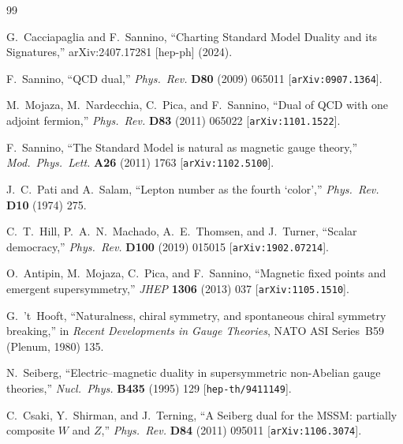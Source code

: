 \documentclass[11pt,a4paper]{article}
\begin{document}
\begin{thebibliography}{99}

  G.~Cacciapaglia and F.~Sannino,
  ``Charting Standard Model Duality and its Signatures,''
  arXiv:2407.17281 [hep-ph] (2024).

  F.~Sannino,
  ``QCD dual,''
  \textit{Phys.~Rev.} \textbf{D80} (2009) 065011
  [\texttt{arXiv:0907.1364}].

  M.~Mojaza, M.~Nardecchia, C.~Pica, and F.~Sannino,
  ``Dual of QCD with one adjoint fermion,''
  \textit{Phys.~Rev.} \textbf{D83} (2011) 065022
  [\texttt{arXiv:1101.1522}].

  F.~Sannino,
  ``The Standard Model is natural as magnetic gauge theory,''
  \textit{Mod.~Phys.~Lett.} \textbf{A26} (2011) 1763
  [\texttt{arXiv:1102.5100}].

  J.~C.~Pati and A.~Salam,
  ``Lepton number as the fourth `color',''
  \textit{Phys.~Rev.} \textbf{D10} (1974) 275.

  C.~T.~Hill, P.~A.~N.~Machado, A.~E.~Thomsen, and J.~Turner,
  ``Scalar democracy,''
  \textit{Phys.~Rev.} \textbf{D100} (2019) 015015
  [\texttt{arXiv:1902.07214}].

  O.~Antipin, M.~Mojaza, C.~Pica, and F.~Sannino,
  ``Magnetic fixed points and emergent supersymmetry,''
  \textit{JHEP} \textbf{1306} (2013) 037
  [\texttt{arXiv:1105.1510}].

  G.~'t~Hooft,
  ``Naturalness, chiral symmetry, and spontaneous chiral symmetry
  breaking,'' in \textit{Recent Developments in Gauge Theories},
  NATO ASI Series~B59 (Plenum, 1980) 135.

  N.~Seiberg,
  ``Electric--magnetic duality in supersymmetric non-Abelian gauge
  theories,''
  \textit{Nucl.~Phys.} \textbf{B435} (1995) 129
  [\texttt{hep-th/9411149}].

  C.~Csaki, Y.~Shirman, and J.~Terning,
  ``A Seiberg dual for the MSSM: partially composite $W$ and $Z$,''
  \textit{Phys.~Rev.} \textbf{D84} (2011) 095011
  [\texttt{arXiv:1106.3074}].

\end{thebibliography}
\end{document}
